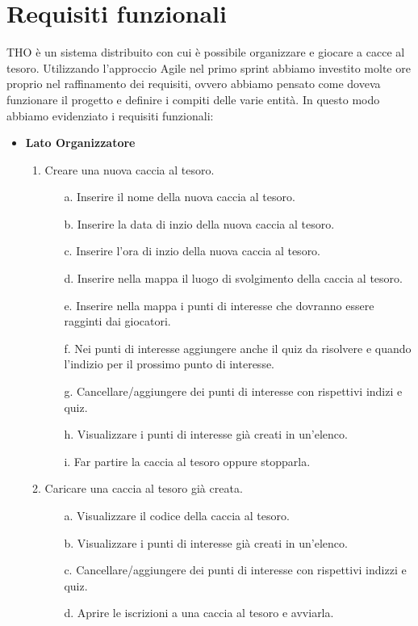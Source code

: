\documentclass[12pt, italian]{article}
\begin{document}
\section{Requisiti funzionali}
THO è un sistema distribuito con cui è possibile organizzare e giocare a cacce al tesoro. Utilizzando l'approccio Agile nel primo sprint abbiamo investito molte ore proprio nel raffinamento dei requisiti, ovvero abbiamo pensato come doveva funzionare il progetto e definire i compiti delle varie entità. In questo modo abbiamo evidenziato i requisiti funzionali:
\begin{itemize}
	\item \textbf{Lato Organizzatore} 
	\begin{enumerate}
		\item Creare una nuova caccia al tesoro.
			\begin{enumerate}
				\item [a.] Inserire il nome della nuova caccia al tesoro.
				\item [b.] Inserire la data di inzio della nuova caccia al tesoro.
				\item [c.] Inserire l'ora di inzio della nuova caccia al tesoro.
				\item [d.] Inserire nella mappa il luogo di svolgimento della caccia al tesoro.
				\item [e.] Inserire nella mappa i punti di interesse che dovranno essere ragginti dai giocatori.
				\item [f.] Nei punti di interesse aggiungere anche il quiz da risolvere e quando l'indizio per il prossimo punto di interesse.
				\item [g.] Cancellare/aggiungere dei punti di interesse con rispettivi indizi e quiz.
				\item [h.] Visualizzare i punti di interesse già creati in un'elenco.
				\item [i.] Far partire la caccia al tesoro oppure stopparla.
			\end{enumerate}
		\item Caricare una caccia al tesoro già creata.
		\begin{enumerate}
			\item [a.] Visualizzare il codice della caccia al tesoro.
			\item [b.] Visualizzare i punti di interesse già creati in un'elenco.
			\item [c.] Cancellare/aggiungere dei punti di interesse con rispettivi indizzi e quiz.
			\item [d.] Aprire le iscrizioni a una caccia al tesoro e avviarla.

\end{enumerate}
\end{enumerate}
\end{itemize}
\end{document}
